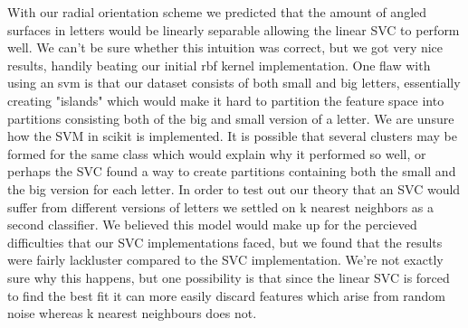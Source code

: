 \documentclass[paper=a4, fontsize=11pt]{scrartcl} %
\numberwithin{equation}{section} %
\numberwithin{figure}{section} %
\numberwithin{table}{section} %
\begin{document}
With our radial orientation scheme we predicted that the amount of angled surfaces in letters would be linearly separable allowing the linear SVC to perform well.
We can't be sure whether this intuition was correct, but we got very nice results, handily beating our initial rbf kernel implementation.
One flaw with using an svm is that our dataset consists of both small and big letters, essentially creating "islands" which would make it hard to partition the feature space into partitions consisting both of the big and small version of a letter.
We are unsure how the SVM in scikit is implemented. 
It is possible that several clusters may be formed for the same class which would explain why it performed so well, or perhaps the SVC found a way to create partitions containing both the small and the big version for each letter.
In order to test out our theory that an SVC would suffer from different versions of letters we settled on k nearest neighbors as a second classifier.
We believed this model would make up for the percieved difficulties that our SVC implementations faced, but we found that the results were fairly lackluster compared to the SVC implementation.
We're not exactly sure why this happens, but one possibility is that since the linear SVC is forced to find the best fit it can more easily discard features which arise from random noise whereas k nearest neighbours does not.
\end{document}
